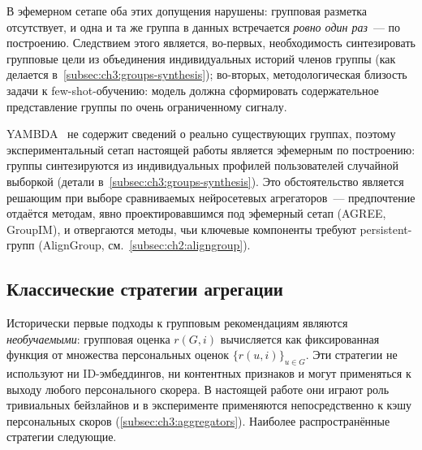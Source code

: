 В эфемерном сетапе оба этих допущения нарушены: групповая разметка отсутствует, и одна и та же группа в данных встречается \emph{ровно один раз}~--- по построению. Следствием этого является, во-первых, необходимость синтезировать групповые цели из объединения индивидуальных историй членов группы (как делается в~\ref{subsec:ch3:groups-synthesis}); во-вторых, методологическая близость задачи к few-shot-обучению: модель должна сформировать содержательное представление группы по очень ограниченному сигналу.

YAMBDA~\cite{yambda2025} не содержит сведений о реально существующих группах, поэтому экспериментальный сетап настоящей работы является эфемерным по построению: группы синтезируются из индивидуальных профилей пользователей случайной выборкой (детали в~\ref{subsec:ch3:groups-synthesis}). Это обстоятельство является решающим при выборе сравниваемых нейросетевых агрегаторов~--- предпочтение отдаётся методам, явно проектировавшимся под эфемерный сетап (AGREE, GroupIM), и отвергаются методы, чьи ключевые компоненты требуют persistent-групп (AlignGroup, см.~\ref{subsec:ch2:aligngroup}).

\subsection{Классические стратегии агрегации}
\label{subsec:ch2:classical}

Исторически первые подходы к групповым рекомендациям являются \emph{необучаемыми}: групповая оценка $r(G, i)$ вычисляется как фиксированная функция от множества персональных оценок $\{r(u, i)\}_{u \in G}$. Эти стратегии не используют ни ID-эмбеддингов, ни контентных признаков и могут применяться к выходу любого персонального скорера. В настоящей работе они играют роль тривиальных бейзлайнов и в эксперименте применяются непосредственно к кэшу персональных скоров (\ref{subsec:ch3:aggregators}). Наиболее распространённые стратегии следующие.


